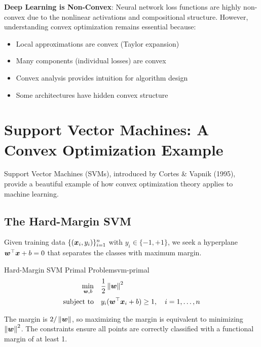 \documentclass[../../main.tex]{subfiles}
\begin{document}
\begin{important}
\textbf{Deep Learning is Non-Convex}: Neural network loss functions are highly non-convex due to the nonlinear activations and compositional structure. However, understanding convex optimization remains essential because:
\begin{itemize}
    \item Local approximations are convex (Taylor expansion)
    \item Many components (individual losses) are convex
    \item Convex analysis provides intuition for algorithm design
    \item Some architectures have hidden convex structure
\end{itemize}
\end{important}

\section{Support Vector Machines: A Convex Optimization Example}
\label{sec:svm}

Support Vector Machines (SVMs), introduced by Cortes \& Vapnik (1995), provide a beautiful example of how convex optimization theory applies to machine learning.

\subsection{The Hard-Margin SVM}

Given training data $\{(\boldsymbol{x}_i, y_i)\}_{i=1}^n$ with $y_i \in \{-1, +1\}$, we seek a hyperplane $\boldsymbol{w}^\top \boldsymbol{x} + b = 0$ that separates the classes with maximum margin.

\begin{definition}{Hard-Margin SVM Primal Problem}{svm-primal}
\begin{align*}
    \min_{\boldsymbol{w}, b} \quad & \frac{1}{2}\left\lVert \boldsymbol{w} \right\rVert^2 \\
    \text{subject to} \quad & y_i(\boldsymbol{w}^\top \boldsymbol{x}_i + b) \geq 1, \quad i = 1, \ldots, n
\end{align*}
\end{definition}

\begin{intuition}
The margin is $2/\left\lVert \boldsymbol{w} \right\rVert$, so maximizing the margin is equivalent to minimizing $\left\lVert \boldsymbol{w} \right\rVert^2$. The constraints ensure all points are correctly classified with a functional margin of at least 1.
\end{intuition}
\end{document}
